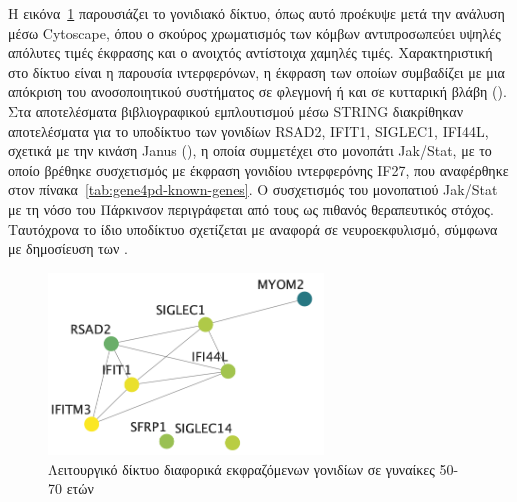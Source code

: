 \documentclass[12pt]{report}
\begin{document}
        \newpage
            Η εικόνα~\ref{fig:cyto_females_50_70} παρουσιάζει το γονιδιακό δίκτυο, όπως αυτό προέκυψε μετά την ανάλυση μέσω Cytoscape, όπου ο σκούρος χρωματισμός των κόμβων αντιπροσωπεύει υψηλές απόλυτες τιμές έκφρασης και ο ανοιχτός αντίστοιχα χαμηλές τιμές. Χαρακτηριστική στο δίκτυο είναι η παρουσία ιντερφερόνων, η έκφραση των οποίων συμβαδίζει με μια απόκριση του ανοσοποιητικού συστήματος σε φλεγμονή ή και σε κυτταρική βλάβη (\emph{\cite{Kopitar-Jerala2017TheActivation}}). Στα αποτελέσματα βιβλιογραφικού εμπλουτισμού μέσω STRING διακρίθηκαν αποτελέσματα για το υποδίκτυο των γονιδίων RSAD2, IFIT1, SIGLEC1, IFI44L, σχετικά με την κινάση Janus (\emph{\cite{Yamaoka2004TheJaks}}), η οποία συμμετέχει στο μονοπάτι Jak/Stat, με το οποίο βρέθηκε συσχετισμός με έκφραση γονιδίου ιντερφερόνης IF27, που αναφέρθηκε στον πίνακα~\ref{tab:gene4pd-known-genes}. Ο συσχετισμός του μονοπατιού Jak/Stat με τη νόσο του Πάρκινσον περιγράφεται από τους \cite{Lashgari2021TheDisease} ως πιθανός θεραπευτικός στόχος. Ταυτόχρονα το ίδιο υποδίκτυο σχετίζεται με αναφορά σε νευροεκφυλισμό, σύμφωνα με δημοσίευση των \cite{Cooray2023NeuroinflammationIRAK4}.
            \begin{figure}[h]
                \centering
                \includegraphics[width=0.65\textwidth]{Cytoscape/cyto_females_50_70.png}
                \caption{Λειτουργικό δίκτυο διαφορικά εκφραζόμενων γονιδίων σε γυναίκες 50-70 ετών}
                \label{fig:cyto_females_50_70}
            \end{figure}
\end{document}
